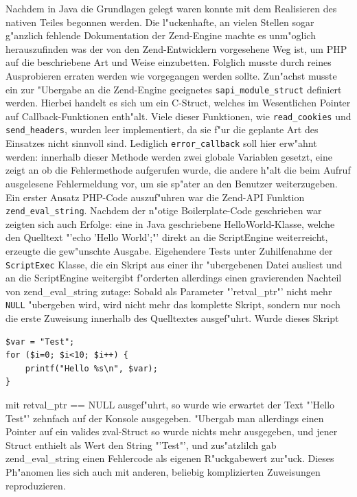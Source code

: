 Nachdem in Java die Grundlagen gelegt waren konnte mit dem Realisieren des nativen Teiles begonnen werden.
Die l"uckenhafte, an vielen Stellen sogar g"anzlich fehlende Dokumentation der Zend-Engine machte es unm"oglich
herauszufinden was der von den Zend-Entwicklern vorgesehene Weg ist, um PHP auf die beschriebene Art und Weise
einzubetten. Folglich musste durch reines Ausprobieren erraten werden wie vorgegangen werden sollte.
Zun"achst musste ein zur "Ubergabe an die Zend-Engine geeignetes \texttt{sapi\_module\_struct} definiert werden.
Hierbei handelt es sich um ein C-Struct, welches im Wesentlichen Pointer auf Callback-Funktionen enth"alt.
Viele dieser Funktionen, wie \texttt{read\_cookies} und \texttt{send\_headers}, wurden leer implementiert, da sie f"ur 
die geplante Art des Einsatzes nicht sinnvoll sind. Lediglich \texttt{error\_callback} soll hier erw"ahnt werden:
innerhalb dieser Methode werden zwei globale Variablen gesetzt, eine zeigt an ob die Fehlermethode aufgerufen wurde,
die andere h"alt die beim Aufruf ausgelesene Fehlermeldung vor, um sie sp"ater an den Benutzer weiterzugeben.
Ein erster Ansatz PHP-Code auszuf"uhren war die Zend-API Funktion \texttt{zend\_eval\_string}. Nachdem der n"otige
Boilerplate-Code geschrieben war zeigten sich auch Erfolge: eine in Java geschriebene HelloWorld-Klasse, welche
den Quelltext "'echo 'Hello World';"' direkt an die ScriptEngine weiterreicht, erzeugte die gew"unschte Ausgabe.
Eigehendere Tests unter Zuhilfenahme der \texttt{ScriptExec} Klasse, die ein Skript aus einer ihr "ubergebenen Datei
ausliest und an die ScriptEngine weitergibt f"orderten allerdings einen gravierenden Nachteil von zend\_eval\_string
zutage: Sobald als Parameter "'retval\_ptr"' nicht mehr \texttt{NULL} "ubergeben wird, wird nicht mehr das komplette
Skript, sondern nur noch die erste Zuweisung innerhalb des Quelltextes ausgef"uhrt. Wurde dieses Skript
\begin{lstlisting}[caption=Testscript f"ur zend\_eval\_string()]
$var = "Test";
for ($i=0; $i<10; $i++) {
    printf("Hello %s\n", $var);
}
\end{lstlisting}
mit retval\_ptr == NULL ausgef"uhrt, so wurde wie erwartet der Text "'Hello Test"' zehnfach auf der Konsole
ausgegeben. "Ubergab man allerdings einen Pointer auf ein valides zval-Struct so wurde nichts mehr ausgegeben,
und jener Struct enthielt als Wert den String "'Test"', und zus"atzlilch gab zend\_eval\_string einen Fehlercode
als eigenen R"uckgabewert zur"uck. Dieses Ph"anomen lies sich auch mit anderen, beliebig komplizierten Zuweisungen 
reproduzieren.


